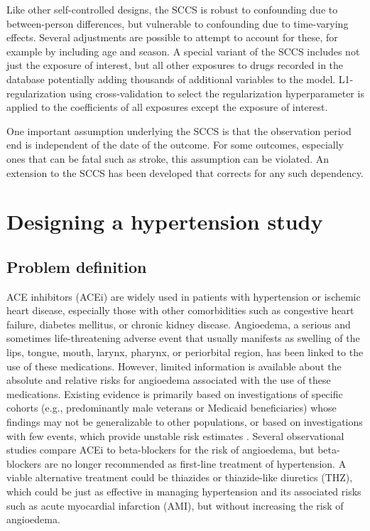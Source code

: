 \documentclass[]{book}
\begin{document}
Like other self-controlled designs, the SCCS is robust to confounding due to between-person differences, but vulnerable to confounding due to time-varying effects. Several adjustments are possible to attempt to account for these, for example by including age and season. A special variant of the SCCS includes not just the exposure of interest, but all other exposures to drugs recorded in the database \citep{simpson_2013} potentially adding thousands of additional variables to the model. L1-regularization using cross-validation to select the regularization hyperparameter is applied to the coefficients of all exposures except the exposure of interest.

One important assumption underlying the SCCS is that the observation period end is independent of the date of the outcome. For some outcomes, especially ones that can be fatal such as stroke, this assumption can be violated. An extension to the SCCS has been developed that corrects for any such dependency. \citep{farrington_2011}

\hypertarget{designing-a-hypertension-study}{%
\section{Designing a hypertension study}\label{designing-a-hypertension-study}}

\hypertarget{problem-definition}{%
\subsection{Problem definition}\label{problem-definition}}

ACE inhibitors (ACEi) are widely used in patients with hypertension or ischemic heart disease, especially those with other comorbidities such as congestive heart failure, diabetes mellitus, or chronic kidney disease. \citep{zaman_2002} Angioedema, a serious and sometimes life-threatening adverse event that usually manifests as swelling of the lips, tongue, mouth, larynx, pharynx, or periorbital region, has been linked to the use of these medications. \citep{sabroe_1997} However, limited information is available about the absolute and relative risks for angioedema associated with the use of these medications. Existing evidence is primarily based on investigations of specific cohorts (e.g., predominantly male veterans or Medicaid beneficiaries) whose findings may not be generalizable to other populations, or based on investigations with few events, which provide unstable risk estimates \citep{powers_2012}. Several observational studies compare ACEi to beta-blockers for the risk of angioedema, \citep{magid_2010, toh_2012} but beta-blockers are no longer recommended as first-line treatment of hypertension. \citep{whelton_2018} A viable alternative treatment could be thiazides or thiazide-like diuretics (THZ), which could be just as effective in managing hypertension and its associated risks such as acute myocardial infarction (AMI), but without increasing the risk of angioedema.
\end{document}

